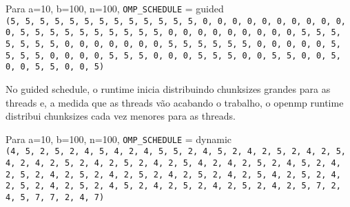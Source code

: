 Para a=10, b=100, n=100, \texttt{OMP\_SCHEDULE} = guided \\
\texttt{(5, 5, 5, 5, 5, 5, 5, 5, 5, 5, 5, 5, 5, 0, 0, 0, 0, 0, 0, 0, 0, 0, 0, 0, 5, 5, 5, 5, 5, 5, 5, 5, 5, 5, 0, 0, 0, 0, 0, 0, 0, 0, 0, 5, 5, 5, 5, 5, 5, 5, 0, 0, 0, 0, 0, 0, 0, 5, 5, 5, 5, 5, 5, 0, 0, 0, 0, 0, 5, 5, 5, 5, 0, 0, 0, 0, 5, 5, 5, 0, 0, 0, 5, 5, 5, 0, 0, 5, 5, 0, 0, 5, 0, 0, 5, 5, 0, 0, 5)}

No guided schedule, o runtime inicia distribuindo chunksizes grandes para as threads e, a medida que as threads vão acabando o trabalho, o openmp runtime distribui chunksizes cada vez menores para as threads.

Para a=10, b=100, n=100, \texttt{OMP\_SCHEDULE} = dynamic \\
\texttt{(4, 5, 2, 5, 2, 4, 5, 4, 2, 4, 5, 5, 2, 4, 5, 2, 4, 2, 5, 2, 4, 2, 5, 4, 2, 4, 2, 5, 2, 4, 2, 5, 2, 4, 2, 5, 4, 2, 4, 2, 5, 2, 4, 5, 2, 4, 2, 5, 2, 4, 2, 5, 2, 4, 2, 5, 2, 4, 2, 5, 2, 4, 2, 5, 4, 2, 5, 2, 4, 2, 5, 2, 4, 2, 5, 2, 4, 5, 2, 4, 2, 5, 2, 4, 2, 5, 2, 4, 2, 5, 7, 2, 4, 5, 7, 7, 2, 4, 7)}


